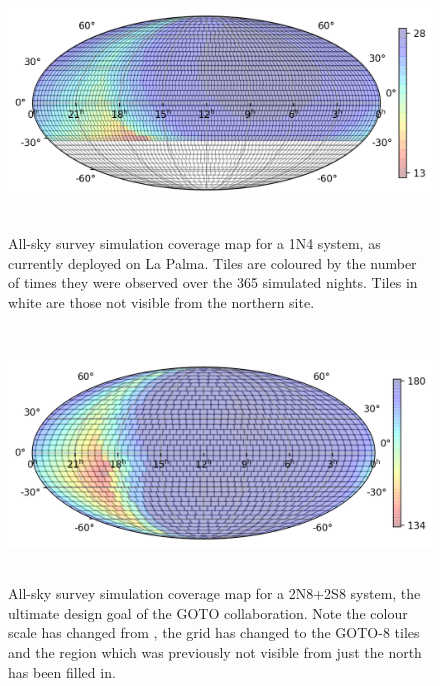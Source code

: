 \begin{colsection}
\begin{colsection}
\begin{figure}[p]
    \begin{center}
        \includegraphics[height=190pt]{images/survey_sims/365_1N4_lite.png}
    \end{center}
    \caption[All-sky survey simulation results: 1N4 system]{
        All-sky survey simulation coverage map for a 1N4 system, as currently deployed on La Palma. Tiles are coloured by the number of times they were observed over the 365 simulated nights. Tiles in white are those not visible from the northern site.
    }\label{fig:survey_sim_1n4}
\end{figure}

\begin{figure}[p]
    \begin{center}
        \includegraphics[height=190pt]{images/survey_sims/365_2N8+2S8_lite.png}
    \end{center}
    \caption[All-sky survey simulation results: 2N8+2S8 system]{
        All-sky survey simulation coverage map for a 2N8+2S8 system, the ultimate design goal of the GOTO collaboration. Note the colour scale has changed from , the grid has changed to the GOTO-8 tiles and the region which was previously not visible from just the north has been filled in.
    }\label{fig:survey_sim_2n8+2s8}
\end{figure}


\end{colsection}
\end{colsection}
